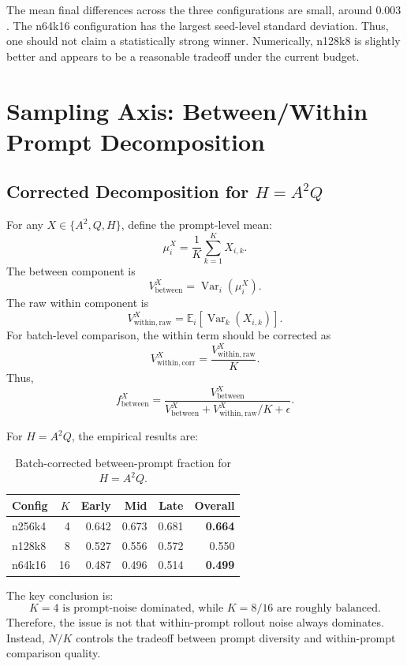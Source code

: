 \documentclass[11pt,a4paper]{article}
\newcommand{\E}{\mathbb{E}}
\newcommand{\Var}{\operatorname{Var}}
\begin{document}
The mean final differences across the three configurations are small, around \(0.003\). The n64k16 configuration has the largest seed-level standard deviation. Thus, one should not claim a statistically strong winner. Numerically, n128k8 is slightly better and appears to be a reasonable tradeoff under the current budget.

\section{Sampling Axis: Between/Within Prompt Decomposition}

\subsection{Corrected Decomposition for \(H=A^2Q\)}

For any \(X\in\{A^2,Q,H\}\), define the prompt-level mean:
\[
\mu_i^X=\frac{1}{K}\sum_{k=1}^K X_{i,k}.
\]
The between component is
\[
V_{\mathrm{between}}^X=\Var_i(\mu_i^X).
\]
The raw within component is
\[
V_{\mathrm{within,raw}}^X=\E_i[\Var_k(X_{i,k})].
\]
For batch-level comparison, the within term should be corrected as
\[
V_{\mathrm{within,corr}}^X=\frac{V_{\mathrm{within,raw}}^X}{K}.
\]
Thus,
\[
f_{\mathrm{between}}^X
=
\frac{V_{\mathrm{between}}^X}
{V_{\mathrm{between}}^X+V_{\mathrm{within,raw}}^X/K+\epsilon}.
\]

For \(H=A^2Q\), the empirical results are:

\begin{table}[h]
\centering
\begin{tabular}{lrrrrr}
\toprule
Config & \(K\) & Early & Mid & Late & Overall\\
\midrule
n256k4 & 4 & 0.642 & 0.673 & 0.681 & \textbf{0.664}\\
n128k8 & 8 & 0.527 & 0.556 & 0.572 & 0.550\\
n64k16 & 16 & 0.487 & 0.496 & 0.514 & \textbf{0.499}\\
\bottomrule
\end{tabular}
\caption{Batch-corrected between-prompt fraction for \(H=A^2Q\).}
\end{table}

The key conclusion is:
\[
\boxed{
K=4 \text{ is prompt-noise dominated, while } K=8/16 \text{ are roughly balanced.}
}
\]
Therefore, the issue is not that within-prompt rollout noise always dominates. Instead, \(N/K\) controls the tradeoff between prompt diversity and within-prompt comparison quality.
\end{document}
